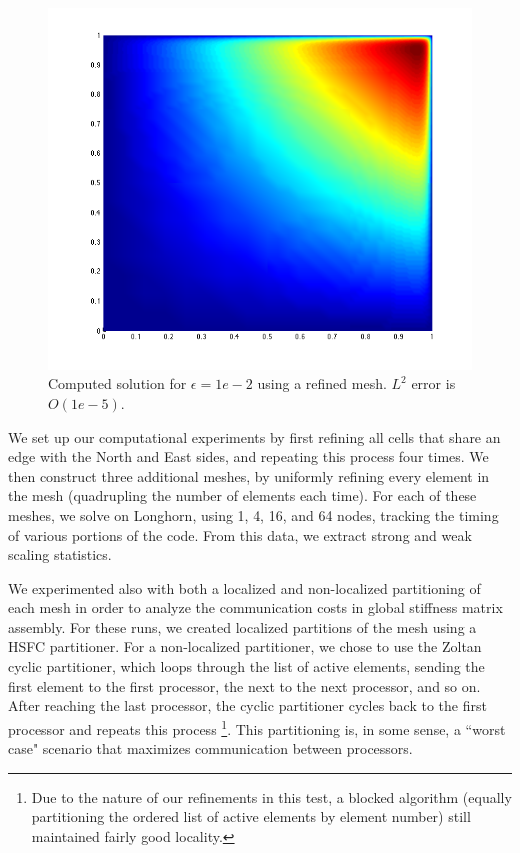 \documentclass{article}
\newcommand{\oneFig}{.45}
\begin{document}
\begin{figure}
\centering
\includegraphics[scale=\oneFig]{figs/Solution12928nomesh.png}
\caption{Computed solution for $\epsilon=1e-2$ using a refined mesh.  $L^2$ error is $O(1e-5)$.}
\end{figure}

We set up our computational experiments by first refining all cells that share an edge with the North and East sides, and repeating this process four times.   We then construct three additional meshes, by uniformly refining every element in the mesh (quadrupling the number of elements each time).  For each of these meshes, we solve on Longhorn, using 1, 4, 16, and 64 nodes, tracking the timing of various portions of the code.  From this data, we extract strong and weak scaling statistics.  

We experimented also with both a localized and non-localized partitioning of each mesh in order to analyze the communication costs in global stiffness matrix assembly.  For these runs, we created localized partitions of the mesh using a HSFC partitioner.  For a non-localized partitioner, we chose to use the Zoltan cyclic partitioner, which loops through the list of active elements, sending the first element to the first processor, the next to the next processor, and so on.  After reaching the last processor, the cyclic partitioner cycles back to the first processor and repeats this process \footnote{Due to the nature of our refinements in this test, a blocked algorithm (equally partitioning the ordered list of active elements by element number) still maintained fairly good locality.}.  This partitioning is, in some sense, a ``worst case" scenario that maximizes communication between processors.  
\end{document}
